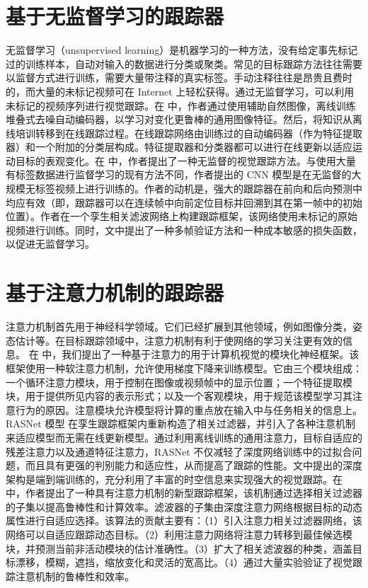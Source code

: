 \section{基于无监督学习的跟踪器}
无监督学习（unsupervised learning）是机器学习的一种方法，没有给定事先标记过的训练样本，自动对输入的数据进行分类或聚类。常见的目标跟踪方法往往需要以监督方式进行训练，需要大量带注释的真实标签。手动注释往往是昂贵且费时的，而大量的未标记视频可在 Internet 上轻松获得。通过无监督学习，可以利用未标记的视频序列进行视觉跟踪。在 \cite{wang2013learning} 中，作者通过使用辅助自然图像，离线训练堆叠式去噪自动编码器，以学习对变化更鲁棒的通用图像特征。然后，将知识从离线培训转移到在线跟踪过程。在线跟踪网络由训练过的自动编码器（作为特征提取器）和一个附加的分类层构成。特征提取器和分类器都可以进行在线更新以适应运动目标的表观变化。在 \cite{wang2019unsupervised} 中，作者提出了一种无监督的视觉跟踪方法。与使用大量有标签数据进行监督学习的现有方法不同，作者提出的 CNN 模型是在无监督的大规模无标签视频上进行训练的。作者的动机是，强大的跟踪器在前向和后向预测中均应有效（即，跟踪器可以在连续帧中向前定位目标并回溯到其在第一帧中的初始位置）。作者在一个孪生相关滤波网络上构建跟踪框架，该网络使用未标记的原始视频进行训练。同时，文中提出了一种多帧验证方法和一种成本敏感的损失函数，以促进无监督学习。
\section{基于注意力机制的跟踪器}
注意力机制首先用于神经科学领域。它们已经扩展到其他领域，例如图像分类，姿态估计等。在目标跟踪领域中，注意力机制有利于使网络的学习关注更有效的信息。
在 \cite{RATM} 中，我们提出了一种基于注意力的用于计算机视觉的模块化神经框架。该框架使用一种软注意力机制，允许使用梯度下降来训练模型。它由三个模块组成：一个循环注意力模块，用于控制在图像或视频帧中的显示位置；一个特征提取模块，用于提供所见内容的表示形式；以及一个客观模块，用于规范该模型学习其注意行为的原因。注意模块允许模型将计算的重点放在输入中与任务相关的信息上。%
RASNet 模型 \cite{wang2018learning} 在孪生跟踪框架内重新构造了相关过滤器，并引入了各种注意机制来适应模型而无需在线更新模型。通过利用离线训练的通用注意力，目标自适应的残差注意力以及通道特征注意力，RASNet 不仅减轻了深度网络训练中的过拟合问题，而且具有更强的判别能力和适应性，从而提高了跟踪的性能。文中提出的深度架构是端到端训练的，充分利用了丰富的时空信息来实现强大的视觉跟踪。在 \cite{choi2017attentional} 中，作者提出了一种具有注意力机制的新型跟踪框架，该机制通过选择相关过滤器的子集以提高鲁棒性和计算效率。滤波器的子集由深度注意力网络根据目标的动态属性进行自适应选择。该算法的贡献主要有：（1）引入注意力相关过滤器网络，该网络可以自适应跟踪动态目标。（2）利用注意力网络将注意力转移到最佳候选模块，并预测当前非活动模块的估计准确性。（3）扩大了相关滤波器的种类，涵盖目标漂移，模糊，遮挡，缩放变化和灵活的宽高比。（4）通过大量实验验证了视觉跟踪注意机制的鲁棒性和效率。
